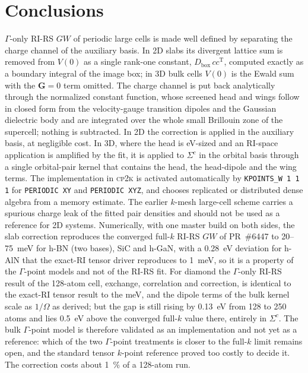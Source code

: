 \documentclass[%
 reprint,
superscriptaddress,
 amsmath,amssymb,
 aps,
prb,
]{revtex4-2}
\newcommand{\bG}{\mathbf{G}}
\newcommand{\Tr}{\mathrm{T}}
\newcommand{\cpk}{\textsc{cp2k}}
\begin{document}
\section{Conclusions}
\label{sec:conclusions}

$\Gamma$-only RI-RS $GW$ of periodic large cells is made well defined by separating the charge
channel of the auxiliary basis. In 2D slabs its divergent lattice sum is removed from $V(0)$
as a single rank-one constant, $D_\mathrm{box}\,cc^\Tr$, computed exactly as a boundary integral
of the image box; in 3D bulk cells $V(0)$ is the Ewald sum with the $\bG=0$ term omitted. The
charge channel is put back analytically through the normalized constant function, whose
screened head and wings follow in closed form from the velocity-gauge transition dipoles and the
Gaussian dielectric body and are integrated over the whole small Brillouin zone of the
supercell; nothing is subtracted. In 2D the correction is applied in the auxiliary basis, at
negligible cost. In 3D, where the head is eV-sized and an RI-space application is amplified by
the fit, it is applied to $\Sigma^c$ in the orbital basis through a single orbital-pair kernel
that contains the head, the head-dipole and the wing terms. The implementation in \cpk{} is
activated automatically by \texttt{KPOINTS\_W 1 1 1} for \texttt{PERIODIC XY} and
\texttt{PERIODIC XYZ}, and chooses replicated or distributed dense algebra from a memory
estimate. The earlier $k$-mesh large-cell scheme carries a spurious charge leak of the fitted
pair densities and should not be used as a reference for 2D systems.
Numerically, with one master build on both sides, the slab correction reproduces the
converged full-$k$ RI-RS $GW$ of PR~\#6447 to 20--75~meV for h-BN (two bases), SiC and
h-GaN, with a 0.28~eV deviation for h-AlN that the exact-RI tensor driver reproduces to 1~meV,
so it is a property of the $\Gamma$-point models and not of the RI-RS fit. For diamond the
$\Gamma$-only RI-RS result of the 128-atom cell, exchange, correlation and correction, is
identical to the exact-RI tensor result to the meV, and the dipole terms of the bulk kernel
scale as $1/\Omega$ as derived; but the gap is still rising by 0.13~eV from 128 to 250 atoms
and lies 0.5~eV above the converged full-$k$ value there, entirely in $\Sigma^c$. The bulk
$\Gamma$-point model is therefore validated as an implementation and not yet as a reference:
which of the two $\Gamma$-point treatments is closer to the full-$k$ limit remains open, and
the standard tensor $k$-point reference proved too costly to decide it. The correction costs
about 1~\% of a 128-atom run.
\end{document}
